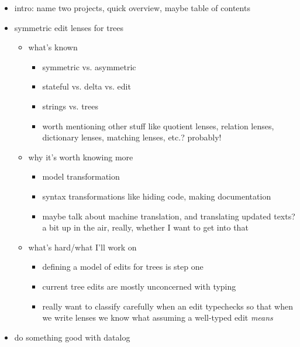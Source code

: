 \documentclass{article}
\begin{document}
\begin{itemize}
    \item intro: name two projects, quick overview, maybe table of contents
    \item symmetric edit lenses for trees
        \begin{itemize}
            \item what's known
                \begin{itemize}
                    \item symmetric vs. asymmetric
                    \item stateful vs. delta vs. edit
                    \item strings vs. trees
                    \item worth mentioning other stuff like quotient lenses,
                        relation lenses, dictionary lenses, matching lenses,
                        etc.? probably!
                \end{itemize}
            \item why it's worth knowing more
                \begin{itemize}
                    \item model transformation
                    \item syntax transformations like hiding code, making
                        documentation
                    \item maybe talk about machine translation, and
                        translating updated texts? a bit up in the air,
                        really, whether I want to get into that
                \end{itemize}
            \item what's hard/what I'll work on
                \begin{itemize}
                    \item defining a model of edits for trees is step one
                    \item current tree edits are mostly unconcerned with typing
                    \item really want to classify carefully when an edit
                        typechecks so that when we write lenses we know what
                        assuming a well-typed edit \emph{means}
                \end{itemize}
        \end{itemize}
    \item do something good with datalog

\end{itemize}
\end{document}

